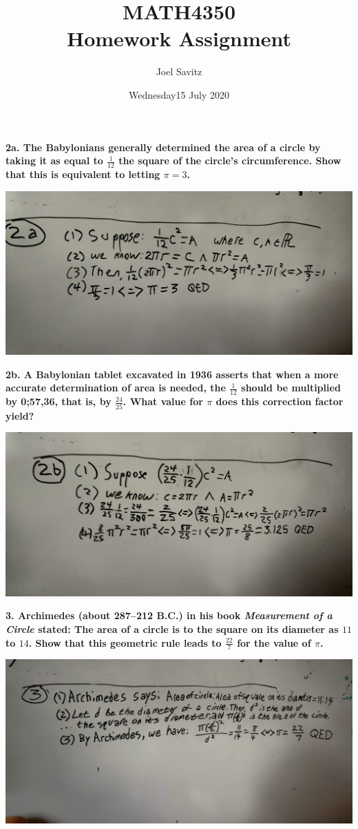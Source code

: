 \documentclass[12pt]{article}
\title{MATH4350 \\ Homework Assignment}
\author{Joel Savitz}
\date{Wednesday15 July 2020}
\begin{document}
\maketitle

\textbf{2a. The Babylonians generally determined the area of a circle
	by taking it as equal to $\frac{1}{12}$ the square of the circle’s
circumference. Show that this is equivalent to letting $\pi = 3$.}
\medskip

\includegraphics[scale=0.08]{2a.jpg}

\pagebreak
\textbf{2b. A Babylonian tablet excavated in 1936 asserts that when a more accurate determination of area is needed, the $\frac{1}{12}$ should be multiplied by 0;57,36, that is, by $\frac{24}{25}$. What value for $\pi$ does this correction factor yield?}
\medskip

\includegraphics[scale=0.08]{2b.jpg}

\pagebreak
\textbf{3. Archimedes (about 287–212 B.C.) in his book \textit{Measurement of a Circle} stated: The area of a circle is to the square on its diameter as $11$ to $14$. Show that this geometric rule leads to $\frac{22}{7}$ for the value of $\pi$. }
\medskip

\includegraphics[scale=0.08]{3.jpg}
\end{document}
